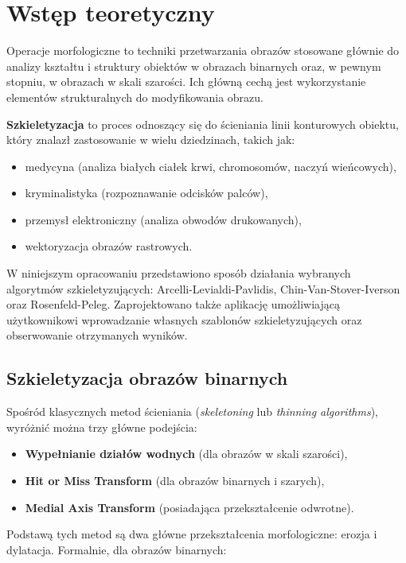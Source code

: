 \section{Wstęp teoretyczny}

Operacje morfologiczne to techniki przetwarzania obrazów stosowane głównie do analizy kształtu i struktury obiektów w obrazach binarnych oraz, w pewnym stopniu, w obrazach w skali szarości. Ich główną cechą jest wykorzystanie elementów strukturalnych do modyfikowania obrazu.

\textbf{Szkieletyzacja} to proces odnoszący się do ścieniania linii konturowych obiektu, który znalazł zastosowanie w wielu dziedzinach, takich jak:
\begin{itemize}
	\item medycyna (analiza białych ciałek krwi, chromosomów, naczyń wieńcowych),
	\item kryminalistyka (rozpoznawanie odcisków palców),
	\item przemysł elektroniczny (analiza obwodów drukowanych),
	\item wektoryzacja obrazów rastrowych.
\end{itemize}

W niniejszym opracowaniu przedstawiono sposób działania wybranych algorytmów szkieletyzujących: Arcelli-Levialdi-Pavlidis, Chin-Van-Stover-Iverson oraz Rosenfeld-Peleg. Zaprojektowano także aplikację umożliwiającą użytkownikowi wprowadzanie własnych szablonów szkieletyzujących oraz obserwowanie otrzymanych wyników.

\subsection{Szkieletyzacja obrazów binarnych}

Spośród klasycznych metod ścieniania (\textit{skeletoning} lub \textit{thinning algorithms}), wyróżnić można trzy główne podejścia:
\begin{itemize}
	\item \textbf{Wypełnianie działów wodnych} (dla obrazów w skali szarości),
	\item \textbf{Hit or Miss Transform} (dla obrazów binarnych i szarych),
	\item \textbf{Medial Axis Transform} (posiadająca przekształcenie odwrotne).
\end{itemize}

Podstawą tych metod są dwa główne przekształcenia morfologiczne: erozja i dylatacja. Formalnie, dla obrazów binarnych:

